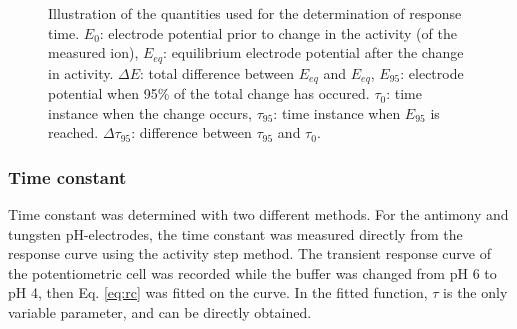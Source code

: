 \begin{figure}
\centering
{}
\caption[Illustration of the parameters used for the determination of response time.]{Illustration of the quantities used for the determination of response time.
$E_0$: electrode potential prior to change in the activity (of the measured ion), $E_{eq}$: equilibrium electrode potential after the change in activity.
$\Delta E$: total difference between $E_{eq}$ and $E_{eq}$, $E_{95}$: electrode potential when 95\% of the total change has occured.
$\tau_0$: time instance when the change occurs, $\tau_{95}$: time instance when $E_{95}$ is reached.
$\Delta \tau_{95}$: difference between $\tau_{95}$ and $\tau_0$.}
\label{fig:response_time_explained}
\end{figure}

			\subsubsection{Time constant}
Time constant was determined with two different methods.
For the antimony and tungsten pH-electrodes, the time constant was measured directly from the response curve using the activity step method.
The transient response curve of the potentiometric cell was recorded while the buffer was changed from pH 6 to pH 4, then Eq. \ref{eq:rc} was fitted on the curve.
In the fitted function, $\tau$ is the only variable parameter, and can be directly obtained.


